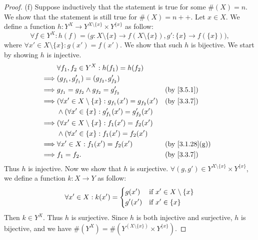 \begin{proof}{(f)}
  Suppose inductively that the statement is true for some \(\#(X) = n\).
  We show that the statement is still true for \(\#(X) = n++\).
  Let \(x \in X\).
  We define a function \(h : Y^X \to Y^{X \setminus \{x\}} \times Y^{\{x\}}\) as follow:
  \[
    \forall f \in Y^X : h(f) = \bigg(g : X \setminus \{x\} \to f(X \setminus \{x\}), g' : \{x\} \to f(\{x\})\bigg),
  \]
  where \(\forall x' \in X \setminus \{x\} : g(x') = f(x')\).
  We show that such \(h\) is bijective.
  We start by showing \(h\) is injective.
  \begin{align*}
             & \forall f_1, f_2 \in Y^X : h(f_1) = h(f_2)                                                      \\
    \implies & (g_{f_1}, g_{f_1}') = (g_{f_2}, g_{f_2}')                                                       \\
    \implies & g_{f_1} = g_{f_2} \land g_{f_2} = g_{f_2}'                    &  & \text{(by \cref{3.5.1})}     \\
    \implies & (\forall x' \in X \setminus \{x\} : g_{f_1}(x') = g_{f_2}(x') &  & \text{(by \cref{3.3.7})}     \\
             & \land (\forall x' \in \{x\} : g_{f_1}'(x') = g_{f_2}'(x')                                       \\
    \implies & (\forall x' \in X \setminus \{x\} : f_1(x') = f_2(x')                                           \\
             & \land (\forall x' \in \{x\} : f_1(x') = f_2(x')                                                 \\
    \implies & \forall x' \in X : f_1(x') = f_2(x')                          &  & \text{(by \cref{3.1.28}(g))} \\
    \implies & f_1 = f_2.                                                    &  & \text{(by \cref{3.3.7})}
  \end{align*}
  Thus \(h\) is injective.
  Now we show that \(h\) is surjective.
  \(\forall (g, g') \in Y^{X \setminus \{x\}} \times Y^{\{x\}}\), we define a function \(k : X \to Y\) as follow:
  \[
    \forall x' \in X : k(x') = \begin{dcases}
      g(x')  & \text{if } x' \in X \setminus \{x\} \\
      g'(x') & \text{if } x' \in \{x\}
    \end{dcases}
  \]
  Then \(k \in Y^X\).
  Thus \(h\) is surjective.
  Since \(h\) is both injective and surjective, \(h\) is bijective, and we have \(\#(Y^X) = \#(Y^{(X \setminus \{x\})} \times Y^{\{x\}})\).

\end{proof}
